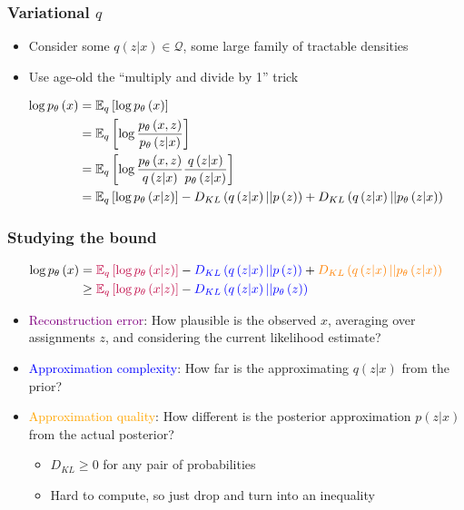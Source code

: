 \documentclass[10pt,mathserif]{beamer}
\begin{document}
\begin{frame}
  \frametitle{Variational $q$}
  \begin{itemize}
  \item Consider some $q\left(z \vert x\right) \in \mathcal{Q}$, some large
    family of tractable densities
  \item Use age-old the ``multiply and divide by 1'' trick
  \end{itemize}
  \begin{align*}
    \log p_{\theta}\left(x\right) &= \mathbb{E}_{q}\left[{\log p_{\theta}\left(x\right)}\right] \\
    &= \mathbb{E}_{q}\left[{\log \frac{p_{\theta}\left(x, z\right)}{p_{\theta}\left(z \vert x\right)}}\right] \\
    &= \mathbb{E}_{q}\left[{\log \frac{p_{\theta}\left(x, z\right)}{q\left(z \vert x\right)} \frac{q\left(z \vert x\right)}{p_{\theta}\left(z \vert x\right)}}\right] \\
    &= \mathbb{E}_{q}\left[{\log p_{\theta}\left(x \vert z\right)}\right] - D_{KL}\left(q\left(z \vert x\right) \vert \vert p\left(z\right)\right) + D_{KL}\left(q\left(z \vert x\right) \vert \vert p_{\theta}\left(z \vert x\right)\right)
  \end{align*}
\end{frame}

\begin{frame}
  \frametitle{Studying the bound}
  \begin{align*}
    \log p_{\theta}\left(x\right) &= \textcolor{purple}{\mathbb{E}_{q}\left[{\log p_{\theta}\left(x \vert z\right)}\right]} - \textcolor{blue}{D_{KL}\left(q\left(z \vert x\right) \vert \vert p\left(z\right)\right)} + \textcolor{orange}{D_{KL}\left(q\left(z \vert x\right) \vert \vert p_{\theta}\left(z \vert x\right)\right)} \\
     &\geq \textcolor{purple}{\mathbb{E}_{q}\left[{\log p_{\theta}\left(x \vert z\right)}\right]} - \textcolor{blue}{D_{KL}\left(q\left(z \vert x\right) \vert \vert p_{\theta}\left(z\right)\right)}
  \end{align*}
  \begin{itemize}
  \item \textcolor{purple}{Reconstruction error}: How plausible is the observed
    $x$, averaging over assignments $z$, and considering the current likelihood
    estimate?
  \item \textcolor{blue}{Approximation complexity}: How far is the approximating
    $q\left(z \vert x\right)$ from the prior?
  \item \textcolor{orange}{Approximation quality}: How different is the
    posterior approximation $p\left(z \vert x\right)$
    from the actual posterior?
    \begin{itemize}
    \item $D_{KL} \geq 0$ for any pair of probabilities
    \item Hard to compute, so just drop and turn into an inequality
    \end{itemize}
  \end{itemize}
\end{frame}
\end{document}
